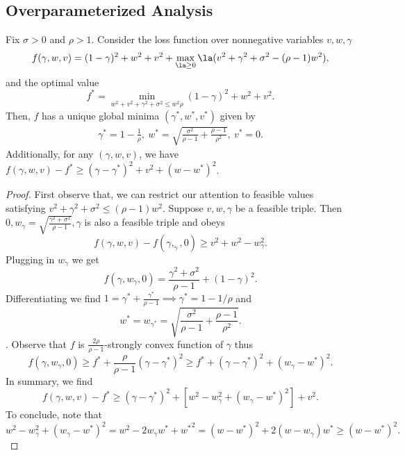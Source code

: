 \subsection{Overparameterized Analysis}
\begin{lemma}\label{asym str} Fix $\sigma>0$ and $\rho>1$. Consider the loss function over nonnegative variables $v,w,\gamma$
\[
f(\gamma,w,v)=(1-\gamma)^2+w^2+v^2+\max_{\la\geq 0}\la (v^2+\gamma^2+\sigma^2-(\rho-1)w^2),
\]
and the optimal value
\[
f^*=\min_{w^2+v^2+\gamma^2+\sigma^2\leq w^2\rho}(1-\gamma)^2+w^2+v^2.
\]
Then, $f$ has a unique global minima $(\gamma^*,w^*,v^*)$ given by
\begin{align}
\gamma^*=1-\frac{1}{\rho},~w^*=\sqrt{\frac{\sigma^2}{\rho-1}+\frac{\rho-1}{\rho^2}},~v^*=0.\label{opt choices}
\end{align}
Additionally, for any $(\gamma,w,v)$, we have $f(\gamma,w,v)-f^*\geq (\gamma-\gamma^*)^2+v^2+(w-w^*)^2$.
\end{lemma}
\begin{proof} First observe that, we can restrict our attention to feasible values satisfying $v^2+\gamma^2+\sigma^2\leq (\rho-1)w^2$. Suppose $v,w,\gamma$ be a feasible triple. Then $0,w_\gamma=\sqrt{\frac{\gamma^2+\sigma^2}{\rho-1}},\gamma$ is also a feasible triple and obeys
\[
f(\gamma,w,v)-f(\gamma,_\gamma,0)\geq v^2+w^2-w_\gamma^2.
\]
Plugging in $w_\gamma$ we get
\[
f(\gamma,w_\gamma,0)=\frac{\gamma^2+\sigma^2}{\rho-1}+(1-\gamma)^2.
\]
Differentiating we find $1=\gamma^*+\frac{\gamma^*}{\rho-1}\implies \gamma^*=1-1/\rho$ and 
\[
w^*=w_{\gamma^*}=\sqrt{\frac{\sigma^2}{\rho-1}+\frac{\rho-1}{\rho^2}}.
\].
Observe that $f$ is $\frac{2\rho}{\rho-1}$-strongly convex function of $\gamma$ thus
\[
f(\gamma,w_\gamma,0)\geq f^*+\frac{\rho}{\rho-1}(\gamma-\gamma^*)^2\geq f^*+(\gamma-\gamma^*)^2+(w_\gamma-w^*)^2.
\]
In summary, we find
\[
f(\gamma,w,v)-f^*\geq (\gamma-\gamma^*)^2+[w^2-w_\gamma^2+(w_\gamma-w^*)^2]+v^2.
\]
To conclude, note that 
\[
w^2-w_\gamma^2+(w_\gamma-w^*)^2=w^2-2w_\gamma w^*+{w^*}^2=(w-w^*)^2+2(w-w_\gamma) w^*\geq (w-w^*)^2.
\]
\end{proof}

